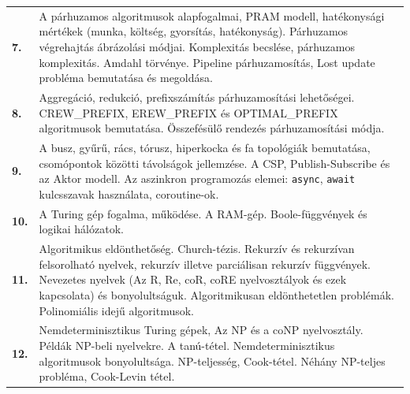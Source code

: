 \documentclass[a4paper,12pt]{article}
\newcommand{\code}[1]{\texttt{#1}}
\begin{document}
\begin{tabular}{|lp{16.5cm}|}
\hline

\textbf{7.} &
A párhuzamos algoritmusok alapfogalmai, PRAM modell, hatékonysági mértékek (munka, költség, gyorsítás, hatékonyság). Párhuzamos végrehajtás ábrázolási módjai. Komplexitás becslése, párhuzamos komplexitás. Amdahl törvénye. Pipeline párhuzamosítás, Lost update probléma bemutatása és megoldása.
\\

\textbf{8.} &
Aggregáció, redukció, prefixszámítás párhuzamosítási lehetőségei. CREW\_PREFIX, EREW\_PREFIX és OPTIMAL\_PREFIX algoritmusok bemutatása. Összefésülő rendezés párhuzamosítási módja.
\\

\textbf{9.} &
A busz, gyűrű, rács, tórusz, hiperkocka és fa topológiák bemutatása, csomópontok közötti távolságok jellemzése. A CSP, Publish-Subscribe és az Aktor modell. Az aszinkron programozás elemei: \code{async}, \code{await} kulcsszavak használata, coroutine-ok.
\\

\hline

\textbf{10.} &
A Turing gép fogalma, működése. A RAM-gép. Boole-függvények és logikai hálózatok.
\\

\textbf{11.} &
Algoritmikus eldönthetőség. Church-tézis. Rekurzív és rekurzívan felsorolható nyelvek, rekurzív illetve parciálisan rekurzív függvények. Nevezetes nyelvek (Az R, Re, coR, coRE nyelvosztályok és ezek kapcsolata) és bonyolultságuk. Algoritmikusan eldönthetetlen problémák. Polinomiális idejű algoritmusok.
\\

\textbf{12.} &
Nemdeterminisztikus Turing gépek, Az NP és a coNP nyelvosztály. Példák NP-beli nyelvekre.  A tanú-tétel. Nemdeterminisztikus algoritmusok bonyolultsága. NP-teljesség, Cook-tétel.  Néhány NP-teljes probléma, Cook-Levin tétel.
\\

\hline

\end{tabular}
\end{document}

